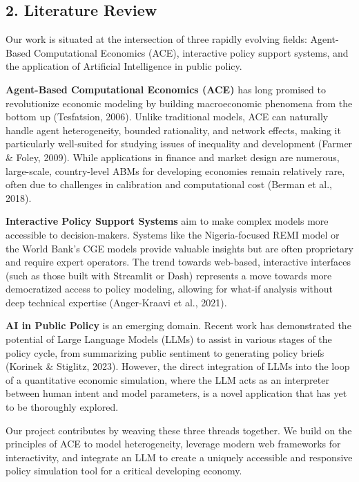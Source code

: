 \documentclass[
]{article}
\begin{document}
\subsection{2. Literature Review}\label{literature-review}

Our work is situated at the intersection of three rapidly evolving
fields: Agent-Based Computational Economics (ACE), interactive policy
support systems, and the application of Artificial Intelligence in
public policy.

\textbf{Agent-Based Computational Economics (ACE)} has long promised to
revolutionize economic modeling by building macroeconomic phenomena from
the bottom up (Tesfatsion, 2006). Unlike traditional models, ACE can
naturally handle agent heterogeneity, bounded rationality, and network
effects, making it particularly well-suited for studying issues of
inequality and development (Farmer \& Foley, 2009). While applications
in finance and market design are numerous, large-scale, country-level
ABMs for developing economies remain relatively rare, often due to
challenges in calibration and computational cost (Berman et al., 2018).

\textbf{Interactive Policy Support Systems} aim to make complex models
more accessible to decision-makers. Systems like the Nigeria-focused
REMI model or the World Bank's CGE models provide valuable insights but
are often proprietary and require expert operators. The trend towards
web-based, interactive interfaces (such as those built with Streamlit or
Dash) represents a move towards more democratized access to policy
modeling, allowing for what-if analysis without deep technical expertise
(Anger-Kraavi et al., 2021).

\textbf{AI in Public Policy} is an emerging domain. Recent work has
demonstrated the potential of Large Language Models (LLMs) to assist in
various stages of the policy cycle, from summarizing public sentiment to
generating policy briefs (Korinek \& Stiglitz, 2023). However, the
direct integration of LLMs into the loop of a quantitative economic
simulation, where the LLM acts as an interpreter between human intent
and model parameters, is a novel application that has yet to be
thoroughly explored.

Our project contributes by weaving these three threads together. We
build on the principles of ACE to model heterogeneity, leverage modern
web frameworks for interactivity, and integrate an LLM to create a
uniquely accessible and responsive policy simulation tool for a critical
developing economy.
\end{document}
